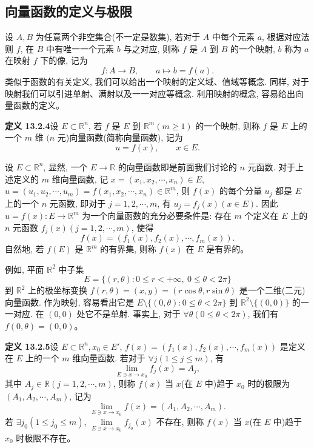 \documentclass[UTF8,12pt,a4paper,fontset=fandol]{ctexart}
\begin{document}
\subsection{向量函数的定义与极限}

设 $A,B$ 为任意两个非空集合(不一定是数集), 若对于 $A$ 中每个元素 $a$, 根据对应法则 $f$, 在 $B$ 中有唯一一个元素 $b$ 与之对应, 则称 $f$ 是 $A$ 到 $B$ 的一个映射, $b$ 称为 $a$ 在映射 $f$ 下的像, 记为
\[
  f:A\to B,\qquad a\mapsto b=f(a).
\]
类似于函数的有关定义, 我们可以给出一个映射的定义域、值域等概念. 同样, 对于映射我们可以引进单射、满射以及一一对应等概念. 利用映射的概念, 容易给出向量函数的定义。

\noindent\textbf{定义 13.2.4}\quad 设 $E\subset\mathbb R^n$, 若 $f$ 是 $E$ 到 $\mathbb R^m(m\geqslant1)$ 的一个映射, 则称 $f$ 是 $E$ 上的一个 $m$ 维 $(n$ 元)向量函数(简称向量函数), 记为
\[
  u=f(x),\qquad x\in E.
\]

设 $E\subset\mathbb R^n$, 显然, 一个 $E\to\mathbb R$ 的向量函数即是前面我们讨论的 $n$ 元函数. 对于上述定义的 $m$ 维向量函数, 记 $x=(x_1,x_2,\cdots,x_n)\in E$, $u=(u_1,u_2,\cdots,u_m)=f(x_1,x_2,\cdots,x_n)\in\mathbb R^m$, 则 $f(x)$ 的每个分量 $u_j$ 都是 $E$ 上的一个 $n$ 元函数, 即对于 $j=1,2,\cdots,m$, 有 $u_j=f_j(x)(x\in E)$. 因此 $u=f(x):E\to\mathbb R^m$ 为一个向量函数的充分必要条件是: 存在 $m$ 个定义在 $E$ 上的 $n$ 元函数 $f_j(x)(j=1,2,\cdots,m)$, 使得
\[
  f(x)=(f_1(x),f_2(x),\cdots,f_m(x)).
\]
自然地, 若 $f(E)$ 是 $\mathbb R^m$ 的有界集, 则称 $f(x)$ 在 $E$ 是有界的。

例如, 平面 $\mathbb R^2$ 中子集
\[
  E=\{(r,\theta):0\leqslant r<+\infty,\ 0\leqslant\theta<2\pi\}
\]
到 $\mathbb R^2$ 上的极坐标变换 $f(r,\theta)=(x,y)=(r\cos\theta,r\sin\theta)$ 是一个二维(二元)向量函数. 作为映射, 容易看出它是 $E\setminus\{(0,\theta):0\leqslant\theta<2\pi\}$ 到 $\mathbb R^2\setminus\{(0,0)\}$ 的一一对应. 在 $(0,0)$ 处它不是单射. 事实上, 对于 $\forall\theta(0\leqslant\theta<2\pi)$, 我们有 $f(0,\theta)=(0,0)$。

\noindent\textbf{定义 13.2.5}\quad 设 $E\subset\mathbb R^n,x_0\in E'$, $f(x)=(f_1(x),f_2(x),\cdots,f_m(x))$ 是定义在 $E$ 上的一个 $m$ 维向量函数. 若对于 $\forall j(1\leqslant j\leqslant m)$, 有
\[
  \lim_{E\ni x\to x_0}f_j(x)=A_j,
\]
其中 $A_j\in\mathbb R(j=1,2,\cdots,m)$, 则称 $f(x)$ 当 $x$(在 $E$ 中)趋于 $x_0$ 时的极限为 $(A_1,A_2,\cdots,A_m)$, 记为
\[
  \lim_{E\ni x\to x_0}f(x)=(A_1,A_2,\cdots,A_m).
\]
若 $\exists j_0(1\leqslant j_0\leqslant m)$, $\lim\limits_{E\ni x\to x_0}f_{j_0}(x)$ 不存在, 则称 $f(x)$ 当 $x$(在 $E$ 中)趋于 $x_0$ 时极限不存在。
\end{document}
